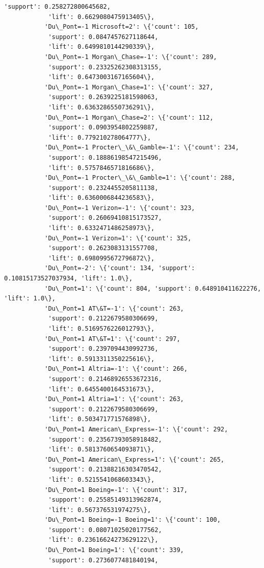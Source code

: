 \documentclass[11pt]{article}
\begin{document}
\begin{Verbatim}[commandchars=\\\{\}]
            'support': 0.258272800645682,
            'lift': 0.6629080475913405\},
           'Du\_Pont=-1 Microsoft=2': \{'count': 105,
            'support': 0.0847457627118644,
            'lift': 0.6499810144290339\},
           'Du\_Pont=-1 Morgan\_Chase=-1': \{'count': 289,
            'support': 0.23325262308313155,
            'lift': 0.6473003167165604\},
           'Du\_Pont=-1 Morgan\_Chase=1': \{'count': 327,
            'support': 0.2639225181598063,
            'lift': 0.6363286550736291\},
           'Du\_Pont=-1 Morgan\_Chase=2': \{'count': 112,
            'support': 0.0903954802259887,
            'lift': 0.779210278064777\},
           'Du\_Pont=-1 Procter\_\&\_Gamble=-1': \{'count': 234,
            'support': 0.18886198547215496,
            'lift': 0.5757846571816686\},
           'Du\_Pont=-1 Procter\_\&\_Gamble=1': \{'count': 288,
            'support': 0.2324455205811138,
            'lift': 0.6360006844236583\},
           'Du\_Pont=-1 Verizon=-1': \{'count': 323,
            'support': 0.26069410815173527,
            'lift': 0.6332471486258973\},
           'Du\_Pont=-1 Verizon=1': \{'count': 325,
            'support': 0.2623083131557708,
            'lift': 0.6980995672796872\},
           'Du\_Pont=-2': \{'count': 134, 'support': 0.10815173527037934, 'lift': 1.0\},
           'Du\_Pont=1': \{'count': 804, 'support': 0.648910411622276, 'lift': 1.0\},
           'Du\_Pont=1 AT\&T=-1': \{'count': 263,
            'support': 0.2122679580306699,
            'lift': 0.5169576226012793\},
           'Du\_Pont=1 AT\&T=1': \{'count': 297,
            'support': 0.2397094430992736,
            'lift': 0.5913311350225616\},
           'Du\_Pont=1 Altria=-1': \{'count': 266,
            'support': 0.21468926553672316,
            'lift': 0.6455400164531673\},
           'Du\_Pont=1 Altria=1': \{'count': 263,
            'support': 0.2122679580306699,
            'lift': 0.503471771576898\},
           'Du\_Pont=1 American\_Express=-1': \{'count': 292,
            'support': 0.23567393058918482,
            'lift': 0.5813760654093871\},
           'Du\_Pont=1 American\_Express=1': \{'count': 265,
            'support': 0.21388216303470542,
            'lift': 0.5215541068603343\},
           'Du\_Pont=1 Boeing=-1': \{'count': 317,
            'support': 0.25585149313962874,
            'lift': 0.567376531974275\},
           'Du\_Pont=1 Boeing=-1 Boeing=1': \{'count': 100,
            'support': 0.08071025020177562,
            'lift': 0.23616624273629122\},
           'Du\_Pont=1 Boeing=1': \{'count': 339,
            'support': 0.2736077481840194,

\end{Verbatim}
\end{document}
